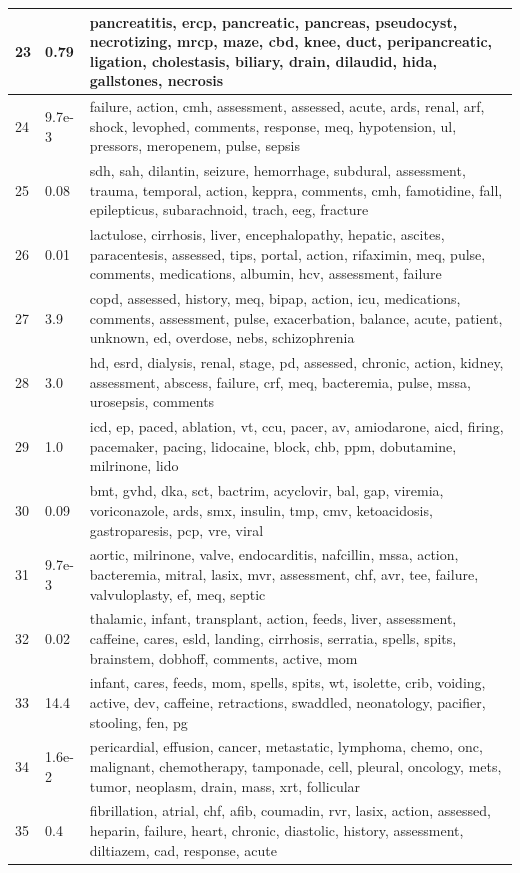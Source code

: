\documentclass[journal]{IEEEtran}
\begin{document}
\begin{appendices}
\begin{center}
\begin{longtable}{| p{} | p{} | p{}|}
  23 & 0.79 & pancreatitis, ercp, pancreatic, pancreas, pseudocyst, necrotizing, mrcp, maze, cbd, knee, duct, peripancreatic, ligation, cholestasis, biliary, drain, dilaudid, hida, gallstones, necrosis \\ \hline
  24 & 9.7e-3 & failure, action, cmh, assessment, assessed, acute, ards, renal, arf, shock, levophed, comments, response, meq, hypotension, ul, pressors, meropenem, pulse, sepsis \\ \hline
  25 & 0.08 & sdh, sah, dilantin, seizure, hemorrhage, subdural, assessment, trauma, temporal, action, keppra, comments, cmh, famotidine, fall, epilepticus, subarachnoid, trach, eeg, fracture \\ \hline
  26 & 0.01 & lactulose, cirrhosis, liver, encephalopathy, hepatic, ascites, paracentesis, assessed, tips, portal, action, rifaximin, meq, pulse, comments, medications, albumin, hcv, assessment, failure \\ \hline
  27 & 3.9 & copd, assessed, history, meq, bipap, action, icu, medications, comments, assessment, pulse, exacerbation, balance, acute, patient, unknown, ed, overdose, nebs, schizophrenia \\ \hline
  28 & 3.0 & hd, esrd, dialysis, renal, stage, pd, assessed, chronic, action, kidney, assessment, abscess, failure, crf, meq, bacteremia, pulse, mssa, urosepsis, comments \\ \hline
  29 & 1.0 & icd, ep, paced, ablation, vt, ccu, pacer, av, amiodarone, aicd, firing, pacemaker, pacing, lidocaine, block, chb, ppm, dobutamine, milrinone, lido \\ \hline
  30 & 0.09 & bmt, gvhd, dka, sct, bactrim, acyclovir, bal, gap, viremia, voriconazole, ards, smx, insulin, tmp, cmv, ketoacidosis, gastroparesis, pcp, vre, viral \\ \hline
  31 & 9.7e-3 & aortic, milrinone, valve, endocarditis, nafcillin, mssa, action, bacteremia, mitral, lasix, mvr, assessment, chf, avr, tee, failure, valvuloplasty, ef, meq, septic \\ \hline
  32 & 0.02 & thalamic, infant, transplant, action, feeds, liver, assessment, caffeine, cares, esld, landing, cirrhosis, serratia, spells, spits, brainstem, dobhoff, comments, active, mom \\ \hline
  33 & 14.4 & infant, cares, feeds, mom, spells, spits, wt, isolette, crib, voiding, active, dev, caffeine, retractions, swaddled, neonatology, pacifier, stooling, fen, pg \\ \hline
  34 & 1.6e-2 & pericardial, effusion, cancer, metastatic, lymphoma, chemo, onc, malignant, chemotherapy, tamponade, cell, pleural, oncology, mets, tumor, neoplasm, drain, mass, xrt, follicular \\ \hline
  35 & 0.4 & fibrillation, atrial, chf, afib, coumadin, rvr, lasix, action, assessed, heparin, failure, heart, chronic, diastolic, history, assessment, diltiazem, cad, response, acute \\ \hline
    \end{longtable}
\end{center}

\end{appendices}
\end{document}
